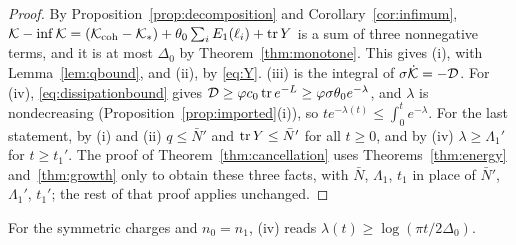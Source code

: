 \begin{proof}
By Proposition~\ref{prop:decomposition} and Corollary~\ref{cor:infimum},
$\mathcal K-\inf\mathcal K=(\mathcal K_{\mathrm{coh}}-\mathcal K_*)+\theta_0\sum_iE_1(\ell_i)+\operatorname{tr} Y$ is a sum of
three nonnegative terms, and it is at most $\Delta_0$ by
Theorem~\ref{thm:monotone}. This gives (i), with Lemma~\ref{lem:qbound}, and
(ii), by \eqref{eq:Y}. (iii) is the integral of $\sigma\dot{\mathcal K}=-\mathcal D$. For
(iv), \eqref{eq:dissipationbound} gives
$\mathcal D\geq\varphi c_0\operatorname{tr} e^{-L}\geq\varphi\sigma\theta_0e^{-\lambda}$, and
$\lambda$ is nondecreasing (Proposition~\ref{prop:imported}(i)), so
$te^{-\lambda(t)}\leq\int_0^te^{-\lambda}$. For the last statement, by (i)
and (ii) $q\leq\bar N'$ and $\operatorname{tr} Y\leq\bar N'$ for all $t\geq0$, and by (iv)
$\lambda\geq\Lambda_1'$ for $t\geq t_1'$. The proof of
Theorem~\ref{thm:cancellation} uses Theorems~\ref{thm:energy}
and~\ref{thm:growth} only to obtain these three facts, with $\bar N$,
$\Lambda_1$, $t_1$ in place of $\bar N'$, $\Lambda_1'$, $t_1'$; the rest of
that proof applies unchanged.
\end{proof}

For the symmetric charges and $n_0=n_1$, (iv) reads
$\lambda(t)\geq\log(\pi t/2\Delta_0)$.
